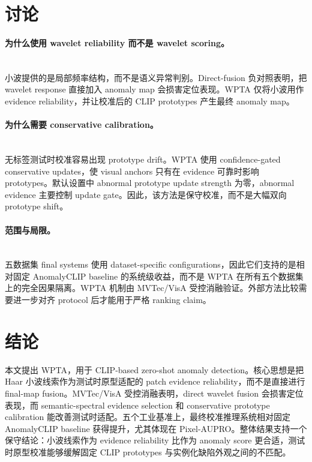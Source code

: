 \documentclass[runningheads]{llncs}
\begin{document}
\section{讨论}

\paragraph{为什么使用 wavelet reliability 而不是 wavelet scoring。}\mbox{}\\
\noindent
小波提供的是局部频率结构，而不是语义异常判别。Direct-fusion 负对照表明，把 wavelet response 直接加入 anomaly map 会损害定位表现。WPTA 仅将小波用作 evidence reliability，并让校准后的 CLIP prototypes 产生最终 anomaly map。

\paragraph{为什么需要 conservative calibration。}\mbox{}\\
\noindent
无标签测试时校准容易出现 prototype drift。WPTA 使用 confidence-gated conservative updates，使 visual anchors 只有在 evidence 可靠时影响 prototypes。默认设置中 abnormal prototype update strength 为零，abnormal evidence 主要控制 update gate。因此，该方法是保守校准，而不是大幅双向 prototype shift。

\paragraph{范围与局限。}\mbox{}\\
\noindent
五数据集 final systems 使用 dataset-specific configurations，因此它们支持的是相对固定 AnomalyCLIP baseline 的系统级收益，而不是 WPTA 在所有五个数据集上的完全因果隔离。WPTA 机制由 MVTec/VisA 受控消融验证。外部方法比较需要进一步对齐 protocol 后才能用于严格 ranking claim。

\section{结论}

本文提出 WPTA，用于 CLIP-based zero-shot anomaly detection。核心思想是把 Haar 小波线索作为测试时原型适配的 patch evidence reliability，而不是直接进行 final-map fusion。MVTec/VisA 受控消融表明，direct wavelet fusion 会损害定位表现，而 semantic-spectral evidence selection 和 conservative prototype calibration 能改善测试时适配。五个工业基准上，最终校准推理系统相对固定 AnomalyCLIP baseline 获得提升，尤其体现在 Pixel-AUPRO。整体结果支持一个保守结论：小波线索作为 evidence reliability 比作为 anomaly score 更合适，测试时原型校准能够缓解固定 CLIP prototypes 与实例化缺陷外观之间的不匹配。



\end{document}
